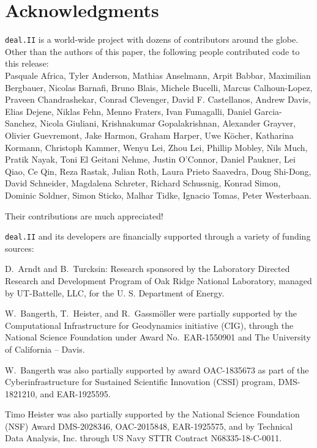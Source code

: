 \documentclass{ansarticle-preprint}
\newcommand{\specialword}[1]{\texttt{#1}}
\newcommand{\dealii}{{\specialword{deal.II}}\xspace}
\begin{document}
\section{Acknowledgments}

\dealii{} is a world-wide project with dozens of contributors around the
globe. Other than the authors of this paper, the following people
contributed code to this release:\\
%
%
Pasquale Africa,
Tyler Anderson,
Mathias Anselmann,
Arpit Babbar,
Maximilian Bergbauer,
Nicolas Barnafi,
Bruno Blais,
Michele Bucelli,
Marcus Calhoun-Lopez,
Praveen Chandrashekar,
Conrad Clevenger,
David F. Castellanos,
Andrew Davis,
Elias Dejene,
Niklas Fehn,
Menno Fraters,
Ivan Fumagalli,
Daniel Garcia-Sanchez,
Nicola Giuliani,
Krishnakumar Gopalakrishnan,
Alexander Grayver,
Olivier Guevremont,
Jake Harmon,
Graham Harper,
Uwe K\"ocher,
Katharina Kormann,
Christoph Kammer,
Wenyu Lei,
Zhou Lei,
Phillip Mobley,
Nils Much,
Pratik Nayak,
Toni El Geitani Nehme,
Justin O'Connor,
Daniel Paukner,
Lei Qiao,
Ce Qin,
Reza Rastak,
Julian Roth,
Laura Prieto Saavedra,
Doug Shi-Dong,
David Schneider,
Magdalena Schreter,
Richard Schussnig,
Konrad Simon,
Dominic Soldner,
Simon Sticko,
Malhar Tidke,
Ignacio Tomas,
Peter Westerbaan.


Their contributions are much appreciated!


\bigskip

\dealii{} and its developers are financially supported through a
variety of funding sources:

D.~Arndt and B.~Turcksin: Research sponsored by the Laboratory Directed Research and
Development Program of Oak Ridge National Laboratory, managed by UT-Battelle,
LLC, for the U. S. Department of Energy.

W.~Bangerth, T.~Heister, and R.~Gassm{\"o}ller were partially
supported by the Computational Infrastructure
for Geodynamics initiative (CIG), through the National Science
Foundation under Award No.~EAR-1550901 and The
University of California -- Davis.


W.~Bangerth was also partially supported by award OAC-1835673 as part of the Cyberinfrastructure for Sustained Scientific Innovation (CSSI)
program, DMS-1821210,
and EAR-1925595.

Timo Heister was also partially supported by the National Science Foundation (NSF)
Award DMS-2028346, OAC-2015848, EAR-1925575, and by
Technical Data Analysis, Inc. through US Navy STTR Contract N68335-18-C-0011.
\end{document}
